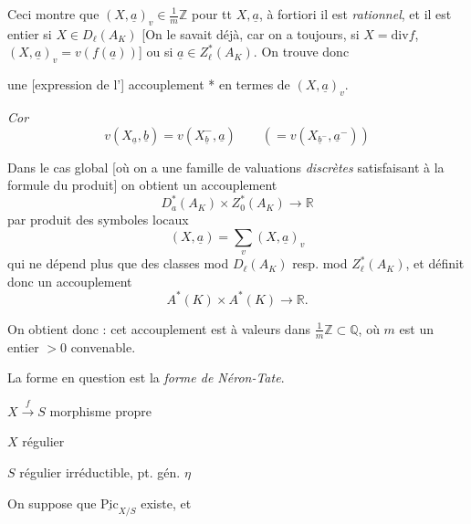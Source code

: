 \documentclass[11pt,a4paper]{article}
\begin{document}
Ceci montre que $(X, \underline{a})_v \in \frac{1}{m}\mathbb{Z}$ pour tt
$X, \underline{a}$,  à fortiori il est \emph{rationnel}, et il
est entier si $X \in D_{\ell}(A_K)$ [On le savait déjà, car on a toujours,
si $X = \mathrm{div} f$, $(X, \underline{a})_v = v(f(\underline{a}))$] ou
si $\underline{a} \in Z_{\ell}^{*}(A_K)$. On trouve donc


une  [expression de l'] accouplement * en termes de
$(X, \underline{a})_v$. \struck{\ill{}}

\emph{Cor}
\[
  v(X_{\underline{a}}, \underline{b}) = v(X^{-}_{\underline{b}}, \underline{a})
  \qquad (= v(X_{\underline{b}^{-}}, \underline{a}^{-}))
\]

Dans le cas global [où on a une famille de valuations \emph{discrètes}
satisfaisant à la formule du produit] on obtient un accouplement
\struck{\ill{}}
\[
  D_a^{*}(A_K) \times Z_0^{*}(A_K) \longrightarrow \mathbb{R}
\]
par  produit des symboles locaux
\[
  (X, \underline{a}) = \sum_v (X, \underline{a})_v
\]
qui ne dépend plus que des classes  mod $D_{\ell}(A_K)$ resp.
mod $Z_{\ell}^{*}(A_K)$, et définit donc un accouplement
\[
  A^{*}(K) \times A^{*}(K) \longrightarrow \mathbb{R} .
\]

On obtient donc : cet accouplement est à valeurs dans
$\frac{1}{m}\mathbb{Z} \subset \mathbb{Q}$, où $m$ est un entier $> 0$
convenable.

La forme en question est la \emph{forme de Néron-Tate}.

$X \xrightarrow{f} S$ morphisme  propre

$X$ régulier

$S$ régulier irréductible, pt. gén. $\eta$

On suppose que $\underline{\mathrm{Pic}}_{X/S}$ existe, et
\end{document}
